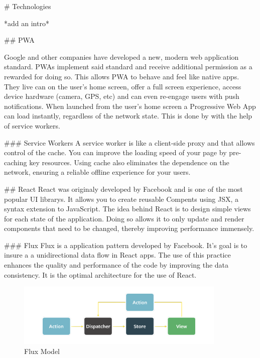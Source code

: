 \begin{markdown}
# Technologies

*add an intro*

## PWA
\cite{WhatIsPWA}

Google and other companies have developed a new, modern web application standard. PWAs implement said standard and receive additional permission as a rewarded for doing so. This allows PWA to behave and feel like native apps. They live can on the user's home screen, offer a full screen experience, access device hardware (camera, GPS, etc) and can even re-engage users with push notifications\cite{PWA}.  When launched from the user’s home screen a Progressive Web App can load instantly, regardless of the network state. This is done by with the help of service workers.

### Service Workers
A service worker is like a client-side proxy and that allows control of the cache. You can improve the loading speed of your page by pre-caching key resources. Using cache also eliminates the dependence on the network, ensuring a reliable offline experience for your users.\cite{ServiceWorker}

## React
React\cite{React} was originaly developed by Facebook and is one of the most popular UI librarys. It allows you to create reusable Compents using JSX, a syntax extension to JavaScript.
The idea behind React is to design simple views for each state of the application. Doing so allows it to only update and render components that need to be changed, thereby improving performance immensely.

### Flux
Flux\cite{OurReadme} is a application pattern developed by Facebook. It's goal is to insure a a unidirectional data flow in React apps. The use of this practice enhances the quality and performance of the code by improving the data consistency. It is the optimal architecture for the use of React.

\begin{figure}[H]
  \includegraphics[width=10cm, center]{./assets/flux.png}
  \caption{Flux Model{\cite{FluxModel}}}
\end{figure}




\end{markdown}
